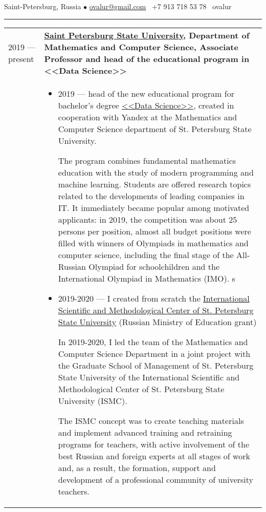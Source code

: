 \documentclass[11pt]{article}
\begin{document}
%

\vspace{0.5em}

\noindent Saint-Petersburg, Russia $\bullet$ \href{mailto:ovalur@gmail.com}{ovalur@gmail.com} \faMobile~+7 913 718 53 78 \faSendO~ovalur

\vspace{0.5em}
\hrule
\vspace{0.5em}

\begin{longtable} {l | p{}}

2019 — present & {\textbf{\href{https://spbu.ru}{Saint Petersburg State University}, Department of Mathematics and Computer Science, Associate Professor and head of the educational program in <<Data Science>>}} \\
& \vspace{-1.5em}
\begin{itemize}
	\item 2019 — head of the new educational program for bachelor's degree \href{https://maad.compscicenter.ru}{<<Data Science>>}, created in cooperation with Yandex at the Mathematics and Computer Science department of St. Petersburg State University.

  The program combines fundamental mathematics education with the study of modern programming and machine learning. Students are offered research topics related to the developments of leading companies in IT. It immediately became popular among motivated applicants: in 2019, the competition was about 25 persons per position, almost all budget positions were filled with winners of Olympiads in mathematics and computer science, including the final stage of the All-Russian Olympiad for schoolchildren and the International Olympiad in Mathematics (IMO).
s
  \item 2019-2020 — I created from scratch the \href{https://gsom.spbu.ru/all_news/event2021-02-04/}{International Scientific and Methodological Center of St. Petersburg State University} (Russian Ministry of Education grant)

  In 2019-2020, I led the team of the Mathematics and Computer Science Department in a joint project with the Graduate School of Management of St. Petersburg State University of the International Scientific and Methodological Center of St. Petersburg State University (ISMC).

  The ISMC concept was to create teaching materials and implement advanced training and retraining programs for teachers, with active involvement of the best Russian and foreign experts at all stages of work and, as a result, the formation, support and development of a professional community of university teachers.


\end{itemize}
\end{longtable}
\end{document}
